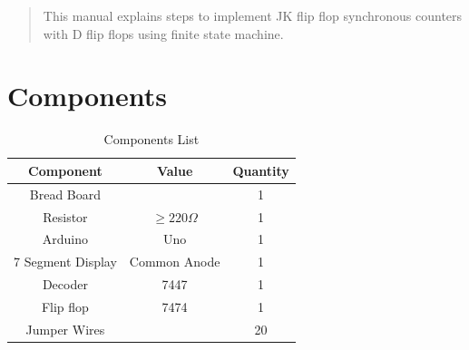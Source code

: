 \documentclass[journal,12pt,twocolumn]{IEEEtran}
\begin{document}
\maketitle

\tableofcontents

\bigskip

\renewcommand{\thefigure}{\theenumi}
\renewcommand{\thetable}{\theenumi}

\setcounter{figure}{0}
\setcounter{table}{0}

\begin{abstract}
This manual explains steps to implement JK flip flop synchronous counters with D flip flops using finite state machine.
\end{abstract}

\section{Components}

\begin{table}[h!] 
	\begin{center}
		\begin{tabular}{ |c|c|c| } 
			\hline
			\multicolumn{1}{|c|}{\textbf{Component}} &\multicolumn{1}{|c|}{\textbf{Value}} & \multicolumn{1}{|c|}{\textbf{Quantity}}  \\
			\hline
		     Bread Board & & 1 \\ 
		     \hline
		     Resistor & $\ge 220 \Omega$ & 1  \\ 
			 \hline
		     Arduino & Uno & 1   \\ 
		     \hline
		     7 Segment Display & Common Anode & 1  \\
			\hline
			Decoder & 7447 & 1 \\
			\hline
			Flip flop & 7474 & 1 \\
			\hline 
			Jumper Wires & & 20 \\
			\hline
		\end{tabular}
		\caption{Components List}
		\label{table:Component_table}
	\end{center}
\end{table}
\end{document}
